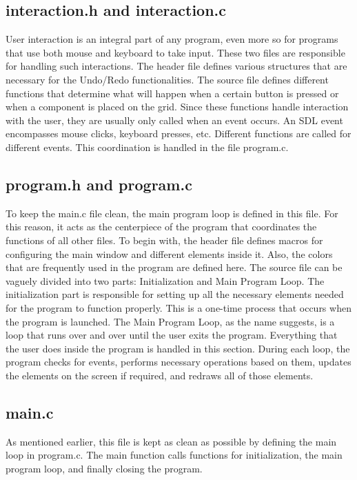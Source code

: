 \documentclass[report]{subfiles}
\begin{document}
\subsection{interaction.h and interaction.c}
    User interaction is an integral part of any program, even more so
    for programs that use both mouse and keyboard to take input.
    These two files are responsible for handling such interactions. The
    header file defines various structures that are necessary for the
    Undo/Redo functionalities.
    The source file defines different functions that determine what will
    happen when a certain button is pressed or when a component is
    placed on the grid. Since these functions handle interaction with
    the user, they are usually only called when an event occurs. An
    SDL event encompasses mouse clicks, keyboard presses, etc.
    Different functions are called for different events. This
    coordination is handled in the file program.c.
\subsection{program.h and program.c}
    To keep the main.c file clean, the main program loop is defined in
    this file. For this reason, it acts as the centerpiece of the program
    that coordinates the functions of all other files. To begin with, the
    header file defines macros for configuring the main window and
    different elements inside it. Also, the colors that are frequently
    used in the program are defined here.
    The source file can be vaguely divided into two parts:
    Initialization and Main Program Loop. The initialization part is
    responsible for setting up all the necessary elements needed for the
    program to function properly. This is a one-time process that
    occurs when the program is launched.
    The Main Program Loop, as the name suggests, is a loop that runs
    over and over until the user exits the program. Everything that the
    user does inside the program is handled in this section. During
    each loop, the program checks for events, performs necessary
    operations based on them, updates the elements on the screen if
    required, and redraws all of those elements.
\subsection{main.c}
    As mentioned earlier, this file is kept as clean as possible by
    defining the main loop in program.c. The main function calls functions for initialization, the main
    program loop, and finally closing the program.
\end{document}
